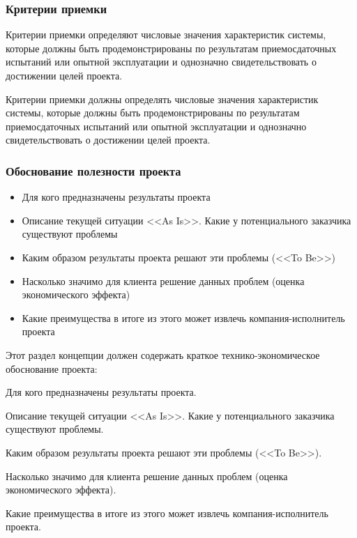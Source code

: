 \documentclass{../industrial-development}
\begin{document}
    \begin{frame} \frametitle{Критерии приемки}
	Критерии приемки определяют числовые значения характеристик системы, которые должны быть продемонстрированы по результатам приемосдаточных испытаний или опытной эксплуатации и однозначно свидетельствовать о достижении целей проекта.
    \end{frame}
    \lecturenotes

Критерии приемки должны определять числовые значения характеристик системы, которые должны быть продемонстрированы по результатам приемосдаточных испытаний или опытной эксплуатации и однозначно свидетельствовать о достижении целей проекта.

    \begin{frame} \frametitle{Обоснование полезности проекта}
	\begin{itemize}
		\item Для кого предназначены результаты проекта
		\item Описание текущей ситуации <<As Is>>. Какие у потенциального заказчика существуют проблемы
		\item Каким образом результаты проекта решают эти проблемы (<<To Be>>)
		\item Насколько значимо для клиента решение данных проблем (оценка экономического эффекта)
		\item Какие преимущества в итоге из этого может извлечь компания-исполнитель проекта
	\end{itemize}
    \end{frame}
    \lecturenotes

Этот раздел концепции должен содержать краткое технико-экономическое обоснование проекта:

Для кого предназначены результаты проекта.

Описание текущей ситуации <<As Is>>. Какие у потенциального заказчика существуют проблемы.

Каким образом результаты проекта решают эти проблемы (<<To Be>>).

Насколько значимо для клиента решение данных проблем (оценка экономического эффекта).

Какие преимущества в итоге из этого может извлечь компания-исполнитель проекта.
\end{document}
